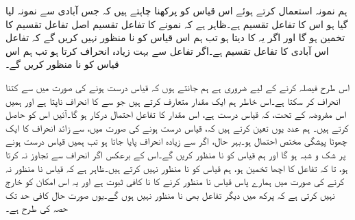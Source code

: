 ہم نمونہ  استعمال کرتے ہوئے اس قیاس کو پرکھنا چاہتے ہیں کہ جس آبادی سے نمونہ لیا گیا ہو اس کا  تفاعل تقسیم  ہے۔ظاہر ہے کہ نمونے کا تفاعل تقسیم  اصل تفاعل تقسیم  کا تخمین ہو گا اور اگر یہ  کا  دیتا ہو تب ہم اس قیاس کو نا منظور  نہیں کریں گے کہ تفاعل  اس آبادی کا تفاعل تقسیم ہے۔اگر  تفاعل  سے بہت زیادہ انحراف کرتا ہو تب ہم اس قیاس کو نا منظور کریں گے۔ 

اس طرح فیصلہ کرنے کے لیے ضروری ہے ہم جانتے ہوں کہ قیاس درست ہونے کی صورت میں  سے    کتنا انحراف کر سکتا ہے۔اس خاطر ہم ایک مقدار متعارف کرتے ہیں جو  سے  کا انحراف ناپتا ہے اور ہمیں اس مفروضہ کے تحت، کہ قیاس درست ہے، اس مقدار کا تفاعل احتمال درکار ہو گا۔آئیں اس کو حاصل کرتے ہیں۔ ہم عدد  یوں تعین کرتے ہیں کہ، قیاس درست ہونے کی صورت میں،  سے زائد انحراف کا ایک  چھوٹا پیشگی مختص احتمال ہو۔بہر حال، اگر  سے زیادہ انحراف پایا جاتا ہو تب ہمیں قیاس درست ہونے پر شک و شبہ ہو گا اور ہم قیاس کو نا منظور کریں گے۔اس کے برعکس اگر انحراف  سے تجاوز نہ کرتا ہو، تا کہ  تفاعل  کا  اچھا تخمین ہو، ہم قیاس کو نا منظور نہیں کرتے ہیں۔ظاہر ہے کہ قیاس نا منظور نہ کرنے کی صورت میں ہمارے پاس قیاس نا منظور کرنے کا نا کافی ثبوت ہے اور یہ اس امکان کو خارج نہیں کرتی ہے کہ پرکھ میں دیگر تفاعل بھی نا منظور نہیں ہوں گے۔یوں صورت حال کافی حد تک  حصہ  کی طرح ہے۔ 

